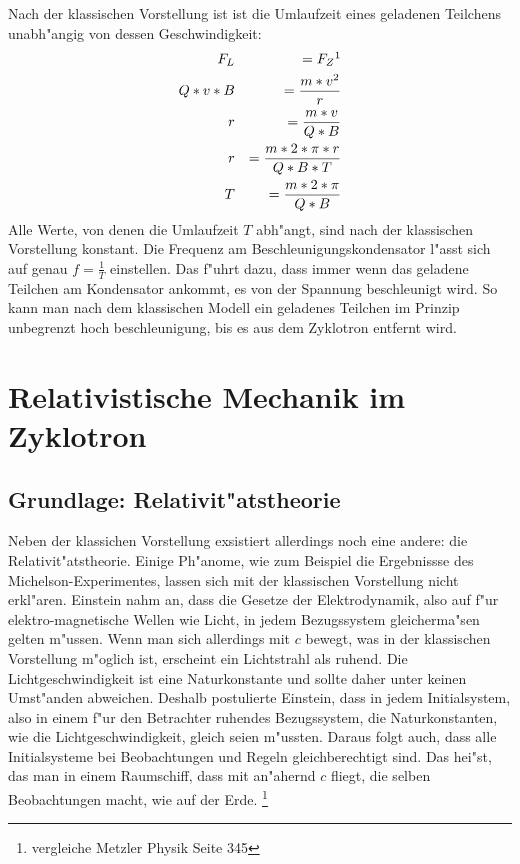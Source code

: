 \documentclass[14pt, a4paper]{report}
\begin{document}
Nach der klassischen Vorstellung ist ist die Umlaufzeit eines geladenen Teilchens 
unabh"angig von dessen Geschwindigkeit:
\begin{eqnarray}
  F_L  		&& = F_Z  \footnotemark  \\
  Q * v * B 	&& = \frac{m * v^2}{r} \label{Radius im Zyklotron}\\
  r		&& = \frac{m * v}{Q * B} \\
  r		&& = \frac{m * 2 * \pi * r}{Q * B * T} \\
  T		&& = \frac{m * 2 * \pi }{Q * B} \label{klassische_Umlaufzeit}
\end{eqnarray}
Alle Werte, von denen die Umlaufzeit $T$ abh"angt, 
sind nach der klassischen Vorstellung konstant. 
Die Frequenz am Beschleunigungskondensator l"asst sich auf genau $f = \frac{1}{T}$
einstellen. Das f"uhrt dazu, dass immer wenn das geladene Teilchen am Kondensator 
ankommt, es von der Spannung beschleunigt wird. So kann man nach dem klassischen Modell
ein geladenes Teilchen im Prinzip unbegrenzt hoch beschleunigung, bis es aus dem
Zyklotron entfernt wird. \label{klassische_Erwartung}

\chapter{Relativistische Mechanik im Zyklotron}
\section{Grundlage: Relativit"atstheorie}
Neben der klassichen Vorstellung exsistiert allerdings noch eine andere: die 
Relativit"atstheorie. Einige Ph"anome, wie zum Beispiel die Ergebnissse 
des Michelson-Experimentes,
lassen sich mit der klassischen Vorstellung nicht erkl"aren. Einstein nahm an, dass 
die Gesetze der Elektrodynamik, also auf f"ur elektro-magnetische Wellen wie Licht,
in jedem Bezugssystem gleicherma"sen gelten m"ussen. 
Wenn man sich allerdings mit $c$ bewegt, was in der klassischen Vorstellung 
m"oglich ist, erscheint ein Lichtstrahl als ruhend. 
Die Lichtgeschwindigkeit ist eine Naturkonstante und sollte daher unter keinen 
Umst"anden abweichen. Deshalb postulierte Einstein, dass in jedem Initialsystem, also in
einem f"ur den Betrachter ruhendes Bezugssystem, die 
Naturkonstanten, wie die Lichtgeschwindigkeit, gleich seien m"ussten. Daraus folgt auch,
dass alle Initialsysteme bei Beobachtungen und Regeln gleichberechtigt sind. Das hei"st,
das man in einem Raumschiff, dass mit an"ahernd $c$ fliegt, die selben Beobachtungen 
macht, wie auf der Erde.
\footnote{vergleiche Metzler Physik Seite 345}
\end{document}
